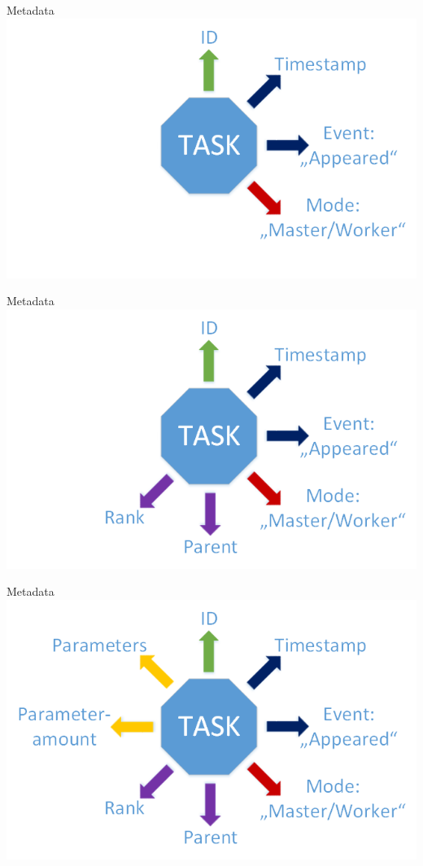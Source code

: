 	\begin{frame}{Metadata}
	\includegraphics[width=1.0\textwidth]{images/Task/zeichnungstep2.png}
	\end{frame}
	
	\begin{frame}{Metadata}
	\includegraphics[width=1.0\textwidth]{images/Task/zeichnungstep1.png}
	\end{frame}
	
	\begin{frame}{Metadata}
	\includegraphics[width=1.0\textwidth]{images/Task/Zeichnung1.png}
	\end{frame}
	
